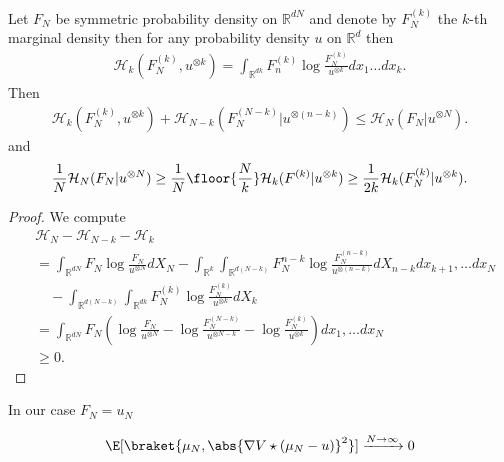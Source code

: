\begin{prop}
 Let $F_N$  be symmetric probability density on $\mathbb{R}^{dN} $ and denote 
 by $F_N^{(k)} $ the $k$-th marginal density then for any probability density $u$ on $\mathbb{R}^{d} $ then
 \begin{align*}
   \mathcal{H}_{k}(F_N^{(k)},u^{\otimes k}  ) = \int_{\mathbb{R}^{dk} } F_n^{(k)}  \log \frac{F_N^{(k)} }{u^{\otimes k} } dx_{1}\ldots dx_k
 .\end{align*}
 Then 
 \begin{align*}
   \mathcal{H}_{k}(F_N^{(k)},u^{\otimes k}  )  + \mathcal{H}_{N-k}(F_N^{(N-k)} | u^{\otimes (n-k)}  ) \le \mathcal{H}_{N}(F_N | u^{\otimes N} )
 .\end{align*}
 and 
 \begin{align*}
   \frac{1}{N} \mathcal{H}_N(F_N | u^{\otimes N} )  \ge \frac{1}{N} \floor{\frac{N}{k}} \mathcal{H}_k(F^{(k)}|u^{\otimes k}  ) \ge  \frac{1}{2k} \mathcal{H}_k(F_N^{(k)} | u^{\otimes k}  )
 .\end{align*}
\end{prop}
\begin{proof}
 We compute 
 \begin{align*}
   &\mathcal{H}_N - \mathcal{H}_{N-k}  - \mathcal{H}_{k}\\
   &= \int_{\mathbb{R}^{dN} }F_N \log  \frac{F_N}{u^{\otimes N} } dX_N - \int_{\mathbb{R}^{k} }\int_{\mathbb{R}^{d(N-k)} } F_N^{n-k} \log \frac{F_N^{(n-k)}}{u^{\otimes (n-k)} } dX_{n-k} dx_{k+1},\ldots dx_N\\
   & \quad - \int_{\mathbb{R}^{d(N-k)}} \int_{\mathbb{R}^{dk} } F_N^{(k)}  \log  \frac{F_N^{(k)} }{u^{\otimes k} } dX_k \\
   &= \int_{\mathbb{R}^{dN} }F_N (\log  \frac{F_N}{u^{\otimes N} } - \log  \frac{F_N^{(N-k)} }{u^{\otimes N-k} } - \log \frac{F_N^{(k)} }{u^{\otimes k} }) dx_{1},\ldots dx_N\\
   &\ge 0
 .\end{align*}
\end{proof}
\begin{note}
 In our case $F_N = u_N$ 
\end{note}
\begin{align*}
  \E[\braket{\mu_N , \abs{\nabla V \star (\mu_N - u)}^2}]  \xrightarrow{N\to \infty} 0 
\end{align*}
